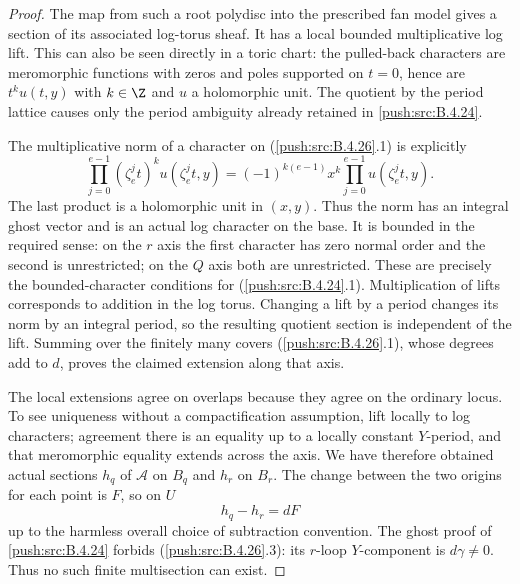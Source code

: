 \begin{proof}
The map from such a root polydisc into the
prescribed fan model gives a section of its
associated log-torus sheaf. It has a local bounded
multiplicative log lift. This can also be seen
directly in a toric chart: the pulled-back characters
are meromorphic functions with zeros and poles
supported on $t=0$, hence are $t^k u(t,y)$ with
$k\in\Z$ and $u$ a holomorphic unit. The quotient
by the period lattice causes only the period
ambiguity already retained in \ref{push:src:B.4.24}.

The multiplicative norm of a character on (\ref{push:src:B.4.26}.1)
is explicitly
\[
 \prod_{j=0}^{e-1}(\zeta_e^j t)^k
              u(\zeta_e^j t,y)
 =(-1)^{k(e-1)}x^k
              \prod_{j=0}^{e-1}u(\zeta_e^j t,y).
 \tag{B.4.26.2}
\]
The last product is a holomorphic unit in $(x,y)$.
Thus the norm has an integral ghost vector and
is an actual log character on the base. It is
bounded in the required sense: on the $r$ axis
the first character has zero normal order and
the second is unrestricted; on the $Q$ axis
both are unrestricted. These are precisely the
bounded-character conditions for (\ref{push:src:B.4.24}.1).
Multiplication of lifts corresponds to addition
in the log torus. Changing a lift by a period
changes its norm by an integral period, so the
resulting quotient section is independent of
the lift. Summing over the finitely many covers
(\ref{push:src:B.4.26}.1), whose degrees add to $d$, proves the
claimed extension along that axis.

The local extensions agree on overlaps because
they agree on the ordinary locus. To see uniqueness
without a compactification assumption, lift locally
to log characters; agreement there is an equality
up to a locally constant $Y$-period, and that
meromorphic equality extends across the axis.
We have therefore obtained actual sections
$h_q$ of $\mathcal A$ on $B_q$ and $h_r$ on
$B_r$. The change between the two origins for
each point is $F$, so on $U$
\[
 h_q-h_r=dF
 \tag{B.4.26.3}
\]
up to the harmless overall choice of subtraction
convention. The ghost proof of \ref{push:src:B.4.24} forbids
(\ref{push:src:B.4.26}.3): its $r$-loop $Y$-component is
$d\gamma\ne0$. Thus no such finite multisection
can exist.


\end{proof}
